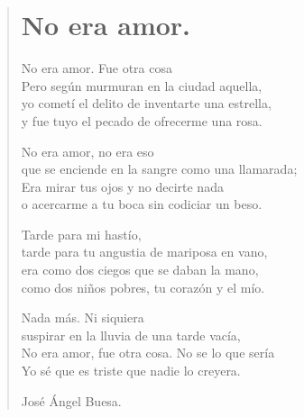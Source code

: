 \documentclass[11pt, portrait, twoside, notitlepage, openright]{book}
\begin{document}
\newpage
\begin{verse}
\begin{center}
\section{No era amor.}
\end{center}
No era amor. Fue otra cosa\\
Pero según murmuran en la ciudad aquella,\\
yo cometí el delito de inventarte una estrella,\\
y fue tuyo el pecado de ofrecerme una rosa.
\newline

No era amor, no era eso\\
que se enciende en la sangre como una llamarada;\\
Era mirar tus ojos y no decirte nada\\
o acercarme a tu boca sin codiciar un beso.
\newline

Tarde para mi hastío,\\
tarde para tu angustia de mariposa en vano,\\
era como dos ciegos que se daban la mano,\\
como dos niños pobres, tu corazón y el mío.
\newline

Nada más. Ni siquiera\\
suspirar en la lluvia de una tarde vacía,\\
No era amor, fue otra cosa. No se lo que sería\\
Yo sé que es triste que nadie lo creyera.
\newline

José Ángel Buesa.
\end{verse}
\end{document}
